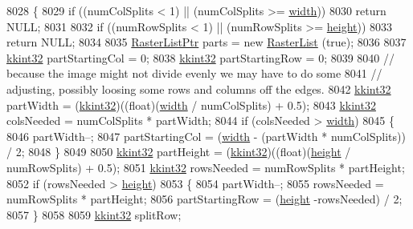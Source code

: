 \begin{DoxyCode}
8028 \{
8029   \textcolor{keywordflow}{if}  ((numColSplits < 1)  ||  (numColSplits >= \hyperlink{class_k_k_b_1_1_raster_ae0bcc103e191c3421d7692dc69ceb554}{width}))
8030     \textcolor{keywordflow}{return} NULL;
8031 
8032   \textcolor{keywordflow}{if}  ((numRowSplits < 1)  ||  (numRowSplits >= \hyperlink{class_k_k_b_1_1_raster_af39ff189de4fbb6de98392e187efafb7}{height}))  
8033     \textcolor{keywordflow}{return} NULL;
8034 
8035   \hyperlink{class_k_k_b_1_1_raster_list}{RasterListPtr}  parts = \textcolor{keyword}{new} \hyperlink{class_k_k_b_1_1_raster_list}{RasterList} (\textcolor{keyword}{true});
8036 
8037   \hyperlink{namespace_k_k_b_a8fa4952cc84fda1de4bec1fbdd8d5b1b}{kkint32}  partStartingCol = 0;
8038   \hyperlink{namespace_k_k_b_a8fa4952cc84fda1de4bec1fbdd8d5b1b}{kkint32}  partStartingRow = 0;
8039  
8040   \textcolor{comment}{// because the image might not divide evenly we may have to do some}
8041   \textcolor{comment}{// adjusting,  possibly loosing some rows and columns off the edges.}
8042   \hyperlink{namespace_k_k_b_a8fa4952cc84fda1de4bec1fbdd8d5b1b}{kkint32}  partWidth  = (\hyperlink{namespace_k_k_b_a8fa4952cc84fda1de4bec1fbdd8d5b1b}{kkint32})((\textcolor{keywordtype}{float})(\hyperlink{class_k_k_b_1_1_raster_ae0bcc103e191c3421d7692dc69ceb554}{width}  / numColSplits) + 0.5);
8043   \hyperlink{namespace_k_k_b_a8fa4952cc84fda1de4bec1fbdd8d5b1b}{kkint32}  colsNeeded = numColSplits * partWidth;
8044   \textcolor{keywordflow}{if}  (colsNeeded > \hyperlink{class_k_k_b_1_1_raster_ae0bcc103e191c3421d7692dc69ceb554}{width})
8045   \{
8046     partWidth--;
8047     partStartingCol = (\hyperlink{class_k_k_b_1_1_raster_ae0bcc103e191c3421d7692dc69ceb554}{width} - (partWidth * numColSplits)) / 2;
8048   \}
8049 
8050   \hyperlink{namespace_k_k_b_a8fa4952cc84fda1de4bec1fbdd8d5b1b}{kkint32}  partHeight = (\hyperlink{namespace_k_k_b_a8fa4952cc84fda1de4bec1fbdd8d5b1b}{kkint32})((\textcolor{keywordtype}{float})(\hyperlink{class_k_k_b_1_1_raster_af39ff189de4fbb6de98392e187efafb7}{height}  / numRowSplits) + 0.5);
8051   \hyperlink{namespace_k_k_b_a8fa4952cc84fda1de4bec1fbdd8d5b1b}{kkint32}  rowsNeeded = numRowSplits * partHeight;
8052   \textcolor{keywordflow}{if}  (rowsNeeded > \hyperlink{class_k_k_b_1_1_raster_af39ff189de4fbb6de98392e187efafb7}{height})
8053   \{
8054     partWidth--;
8055     rowsNeeded = numRowSplits * partHeight;
8056     partStartingRow = (\hyperlink{class_k_k_b_1_1_raster_af39ff189de4fbb6de98392e187efafb7}{height} -rowsNeeded) / 2;
8057   \}
8058 
8059   \hyperlink{namespace_k_k_b_a8fa4952cc84fda1de4bec1fbdd8d5b1b}{kkint32}  splitRow;

\end{DoxyCode}
